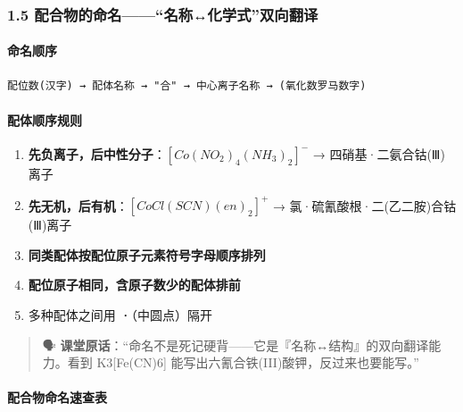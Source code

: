 \documentclass[a4paper,11pt]{ctexart}
\providecommand{\tightlist}{\setlength{\itemsep}{0pt}\setlength{\parskip}{0pt}}
\begin{document}
\subsubsection{1.5 配合物的命名------``名称↔化学式''双向翻译}\label{ux914dux5408ux7269ux7684ux547dux540dux540dux79f0ux5316ux5b66ux5f0fux53ccux5411ux7ffbux8bd1}

\paragraph{命名顺序}\label{ux547dux540dux987aux5e8f}

\begin{verbatim}
配位数(汉字) → 配体名称 → "合" → 中心离子名称 → (氧化数罗马数字)
\end{verbatim}

\paragraph{配体顺序规则}\label{ux914dux4f53ux987aux5e8fux89c4ux5219}

\begin{enumerate}
\def\labelenumi{\arabic{enumi}.}
\tightlist
\item
  \textbf{先负离子，后中性分子}：\([Co(NO_2)_4(NH_3)_2]^-\) → 四硝基·二氨合钴(Ⅲ)离子
\item
  \textbf{先无机，后有机}：\([CoCl(SCN)(en)_2]^+\) → 氯·硫氰酸根·二(乙二胺)合钴(Ⅲ)离子
\item
  \textbf{同类配体按配位原子元素符号字母顺序排列}
\item
  \textbf{配位原子相同，含原子数少的配体排前}
\item
  多种配体之间用 \textbf{·}（中圆点）隔开
\end{enumerate}

\begin{quote}
🗣️ \textbf{课堂原话}：``命名不是死记硬背------它是『名称↔结构』的双向翻译能力。看到 K3{[}Fe(CN)6{]} 能写出六氰合铁(III)酸钾，反过来也要能写。''
\end{quote}

\paragraph{配合物命名速查表}\label{ux914dux5408ux7269ux547dux540dux901fux67e5ux8868}
\end{document}
